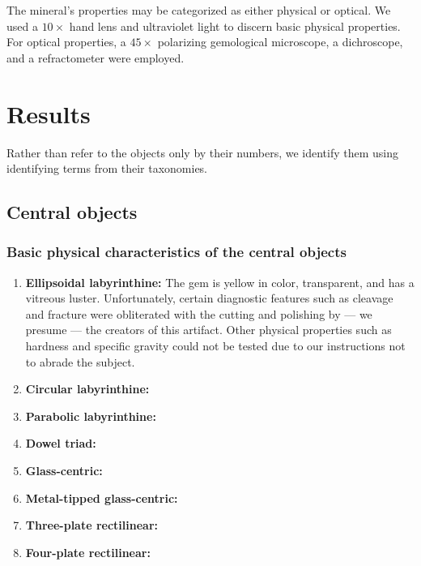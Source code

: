 \documentclass[10pt]{article}
\theoremstyle{definition}
\begin{document}
The mineral's properties may be categorized as either physical or optical.
We used a $10\times$ hand lens and ultraviolet light to discern basic physical properties.
For optical properties, a $45\times$ polarizing gemological microscope, a dichroscope, and a refractometer were employed.


\section{Results}
Rather than refer to the objects only by their numbers, we identify them using identifying terms from their taxonomies.

\subsection{Central objects}
\subsubsection{Basic physical characteristics of the central objects}

\begin{enumerate}[(001)]
\item \textbf{Ellipsoidal labyrinthine:} The gem is yellow in color, transparent, and has a vitreous luster.
    Unfortunately, certain diagnostic features such as cleavage and fracture were obliterated with the cutting and polishing by --- we presume --- the creators of this artifact.
    Other physical properties such as hardness and specific gravity could not be tested due to our instructions not to abrade the subject.
\item \textbf{Circular labyrinthine:}
\item \textbf{Parabolic labyrinthine:}
\item \textbf{Dowel triad:}
\item \textbf{Glass-centric:}
\item \textbf{Metal-tipped glass-centric:}
\item \textbf{Three-plate rectilinear:}
\item \textbf{Four-plate rectilinear:}
\end{enumerate}
\end{document}

